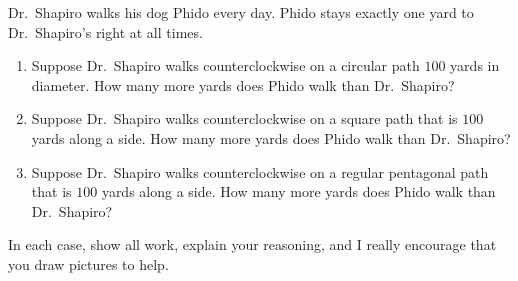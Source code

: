 \documentclass[noauthor,hints,nooutcomes,handout,12pt]{ximera}
\begin{document}
\begin{question} %

 
Dr.\ Shapiro walks his dog Phido every day. Phido stays exactly one
yard to Dr.\ Shapiro's right at all times.

\begin{enumerate}
\item Suppose Dr.\ Shapiro walks counterclockwise on a circular path
  $100$ yards in diameter. How many more yards does Phido walk than
  Dr.\ Shapiro? 
\item Suppose Dr.\ Shapiro walks counterclockwise on a square path
  that is $100$ yards along a side.   How many more yards does Phido walk than
  Dr.\ Shapiro? 
\item Suppose Dr.\ Shapiro walks counterclockwise on a regular
  pentagonal path that is $100$ yards along a side.   How many more yards does Phido walk than
  Dr.\ Shapiro? 
\end{enumerate}
In each case, show all work, explain your reasoning, and I really
encourage that you draw pictures to help.


\end{question}
\end{document}
